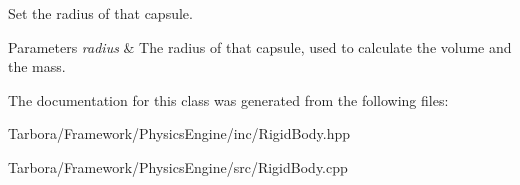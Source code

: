 Set the radius of that capsule. 


\begin{DoxyParams}{Parameters}
{\em radius} & The radius of that capsule, used to calculate the volume and the mass. \\
\hline
\end{DoxyParams}


The documentation for this class was generated from the following files\+:\begin{DoxyCompactItemize}
\item 
Tarbora/\+Framework/\+Physics\+Engine/inc/Rigid\+Body.\+hpp\item 
Tarbora/\+Framework/\+Physics\+Engine/src/Rigid\+Body.\+cpp\end{DoxyCompactItemize}
